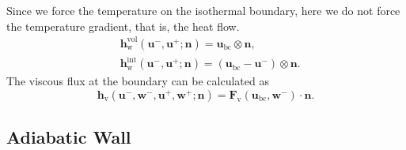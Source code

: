 \documentclass{develop-note}
\begin{document}
Since we force the temperature on the isothermal boundary, here we do not force the temperature gradient, that is, the heat flow.
\begin{equation}
  \begin{aligned}
  &\mathbf{h}^{\mathrm{vol}}_{\mathrm{w}}(\mathbf{u}^{-},\mathbf{u}^{+};\mathbf{n})=\mathbf{u}_{\mathrm{bc}}\otimes\mathbf{n},\\
  &\mathbf{h}^{\mathrm{int}}_{\mathrm{w}}(\mathbf{u}^{-},\mathbf{u}^{+};\mathbf{n})=\left(\mathbf{u}_{\mathrm{bc}}-\mathbf{u}^{-}\right)\otimes\mathbf{n}.
  \end{aligned}
\end{equation}
The viscous flux at the boundary can be calculated as
\begin{equation}
  \mathbf{h}_{\mathrm{v}}(\mathbf{u}^{-},\mathbf{w}^{-},\mathbf{u}^{+},\mathbf{w}^{+};\mathbf{n})=\mathbf{F}_{\mathrm{v}}(\mathbf{u}_{\mathrm{bc}},\mathbf{w}^{-})\cdot\mathbf{n}.
\end{equation}

\subsection*{Adiabatic Wall}
\end{document}
